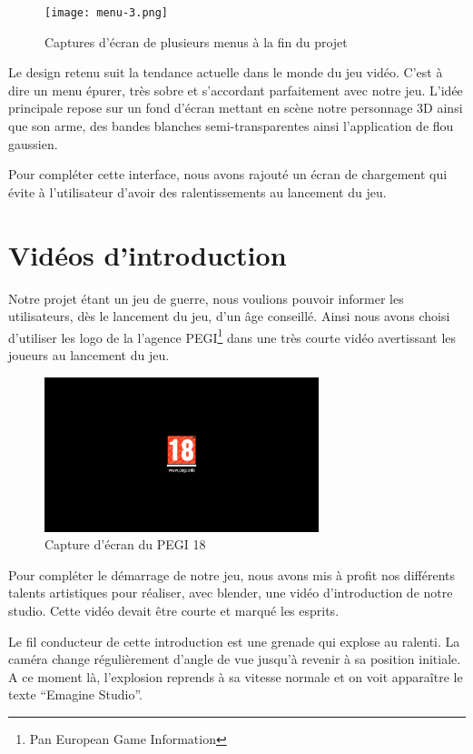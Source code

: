 \documentclass[11pt]{report}
\begin{document}
\begin{figure}[htbp]
\centering
\texttt{[image: menu-3.png]}
\caption{Captures d'écran de plusieurs menus à la fin du projet}
\end{figure}

Le design retenu suit la tendance actuelle dans le monde du jeu vidéo. C'est à dire un menu épurer, très sobre et s'accordant parfaitement avec notre jeu. L'idée principale repose sur un fond d'écran mettant en scène notre personnage 3D ainsi que son arme, des bandes blanches semi-transparentes ainsi l'application de flou gaussien.

Pour compléter cette interface, nous avons rajouté un écran de chargement qui évite à l'utilisateur d'avoir des ralentissements au lancement du jeu.

\section{Vidéos d'introduction}

Notre projet étant un jeu de guerre, nous voulions pouvoir informer les utilisateurs, dès le lancement du jeu, d'un âge conseillé. Ainsi nous avons choisi d'utiliser les logo de la l'agence PEGI\footnote{Pan European Game Information} dans une très courte vidéo avertissant les joueurs au lancement du jeu.

\begin{figure}[htbp]
\centering
\includegraphics[width=8cm]{pegi18.png}
\caption{Capture d'écran du PEGI 18}
\end{figure}

Pour compléter le démarrage de notre jeu, nous avons mis à profit nos différents talents artistiques pour réaliser, avec blender, une vidéo d'introduction de notre studio. Cette vidéo devait être courte et marqué les esprits.

Le fil conducteur de cette introduction est une grenade qui explose au ralenti. La caméra change régulièrement d'angle de vue jusqu'à revenir à sa position initiale. A ce moment là, l'explosion reprends à sa vitesse normale et on voit apparaître le texte ``Emagine Studio''.
\end{document}
